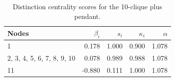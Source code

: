 \begin{table}
\centering
\caption{\label{tab:clique10pendant}Distinction centrality scores for the 10-clique plus pendant.}
\centering
\begin{tabular}[t]{lrrrr}
\toprule
Nodes & $\beta_i$ & $s_i$ & $\kappa_i$ & $\alpha$\\
\midrule
1 & 0.178 & 1.000 & 0.900 & 1.078\\
2, 3, 4, 5, 6, 7, 8, 9, 10 & 0.078 & 0.989 & 0.988 & 1.078\\
11 & -0.880 & 0.111 & 1.000 & 1.078\\
\bottomrule
\end{tabular}
\end{table}
